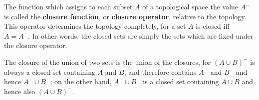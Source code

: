 The function which assigns to each subset $A$ of a topological space the value $A^{-}$ is called the \textbf{closure function}, or \textbf{closure operator}, relative to the topology. This operator determines the topology completely, for a set $A$ is closed iff $A = A^{-}$. In other words, the closed sets are simply the sets which are fixed under the closure operator.

The closure of the union of two sets is the union of the closures, for $(A \cup B)^{-}$ is always a closed set containing $A$ and $B$, and therefore contains $A^{-}$ and $B^{-}$ and hence $A^{-} \cup B^{-}$; on the other hand, $A^{-} \cup B^{-}$ is a closed set containing $A \cup B$ and hence also $(A \cup B)^{-}$.
